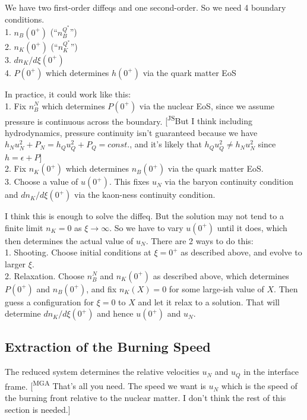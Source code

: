 \documentclass[11pt]{article}
\newcommand{\mga}[1]{{\color[rgb]{0.8,0,0}#1}}
\newcommand{\mgacom}[1]{\textsf{\color[rgb]{0.75,0,0}[\textsuperscript{MGA} #1]}}
\newcommand{\JScom}[1]{\textsf{\color{violet} [\textsuperscript{JS}#1]}}
\begin{document}
\mga{We have two first-order diffeqs and one second-order. So we need 4 boundary conditions. \\
1. $n_B(0^+)$ \quad (``$n_B^{Q^*}$'') \\
2. $n_K(0^+)$ \quad (``$n_K^{Q^*}$'') \\
3. $dn_K/d\xi(0^+)$ \\
4. $P(0^+)$ which determines $h(0^+)$ via the quark matter EoS

\medskip
In practice, it could work like this: \\
1. Fix $n_B^N$ which determines $P(0^+)$ via the nuclear EoS, since we assume pressure is continuous across the boundary. \JScom{But I think including hydrodynamics, pressure continuity isn't guaranteed because we have $h_Nu_N^2 + P_N = h_Qu_Q^2 + P_Q = const.$, and it's likely that $h_Qu_Q^2 \neq h_N u_N^2$ since $h = \epsilon + P$}\\
2. Fix $n_K(0^+)$ which determines $n_B(0^+)$ via the quark matter EoS.\\
3. Choose a value of $u(0^+)$. This fixes $u_N$ via the baryon continuity condition and $dn_K/d\xi(0^+)$ via the kaon-ness continuity condition. 

\bigskip
I think this is enough to solve the diffeq. But the solution may not tend to a finite limit $n_K=0$ as 
$\xi\to\infty$. So we have to vary
$u(0^+)$ until it does, which then 
determines the actual value of $u_N$. 
There are 2 ways to do this:\\
1. Shooting. Choose initial conditions at $\xi=0^+$ as described above, and evolve to larger $\xi$. \\
2. Relaxation. Choose $n_B^N$ and $n_K(0^+)$ as described above, which determines $P(0^+)$ and $n_B(0^+)$, and fix $n_K(X)=0$ for some large-ish value of $X$. Then guess a configuration for $\xi=0$ to $X$ and let it relax to a solution. That will determine $dn_K/d\xi(0^+)$ and hence $u(0^+)$ and $u_N$. 
}


\subsection{Extraction of the Burning Speed}

The reduced system determines the relative velocities 
$u_N$ and $u_Q$ in the interface frame.
\mgacom{That's all you need. The speed we want is $u_N$ which is the speed of the burning front relative to the nuclear matter. I don't think the rest of this section is needed.}
\end{document}
